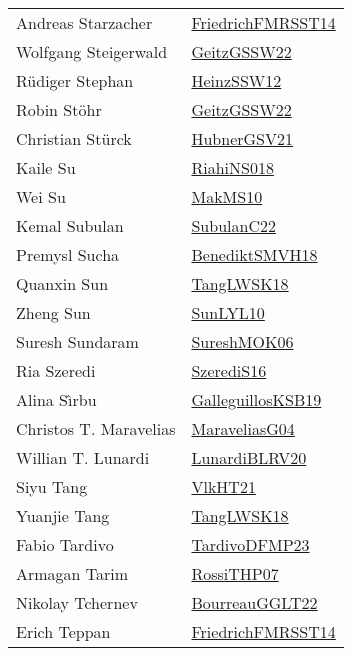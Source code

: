 {\begin{longtable}{p{4cm}p{20cm}}
Andreas Starzacher & \href{papers/FriedrichFMRSST14.pdf}{FriedrichFMRSST14}\cite{FriedrichFMRSST14} \\
Wolfgang Steigerwald & \href{papers/GeitzGSSW22.pdf}{GeitzGSSW22}\cite{GeitzGSSW22} \\
R{\"{u}}diger Stephan & \href{articles/HeinzSSW12.pdf}{HeinzSSW12}\cite{HeinzSSW12} \\
Robin St{\"{o}}hr & \href{papers/GeitzGSSW22.pdf}{GeitzGSSW22}\cite{GeitzGSSW22} \\
Christian St{\"{u}}rck & \href{articles/HubnerGSV21.pdf}{HubnerGSV21}\cite{HubnerGSV21} \\
Kaile Su & \href{papers/RiahiNS018.pdf}{RiahiNS018}\cite{RiahiNS018} \\
Wei Su & \href{papers/MakMS10.pdf}{MakMS10}\cite{MakMS10} \\
Kemal Subulan & \href{articles/SubulanC22.pdf}{SubulanC22}\cite{SubulanC22} \\
Premysl Sucha & \href{papers/BenediktSMVH18.pdf}{BenediktSMVH18}\cite{BenediktSMVH18} \\
Quanxin Sun & \href{articles/TangLWSK18.pdf}{TangLWSK18}\cite{TangLWSK18} \\
Zheng Sun & \href{papers/SunLYL10.pdf}{SunLYL10}\cite{SunLYL10} \\
Suresh Sundaram & \href{articles/SureshMOK06.pdf}{SureshMOK06}\cite{SureshMOK06} \\
Ria Szeredi & \href{papers/SzerediS16.pdf}{SzerediS16}\cite{SzerediS16} \\
Alina S{\^{\i}}rbu & \href{papers/GalleguillosKSB19.pdf}{GalleguillosKSB19}\cite{GalleguillosKSB19} \\
Christos T. Maravelias & \href{papers/MaraveliasG04.pdf}{MaraveliasG04}\cite{MaraveliasG04} \\
Willian T. Lunardi & \href{articles/LunardiBLRV20.pdf}{LunardiBLRV20}\cite{LunardiBLRV20} \\
Siyu Tang & \href{articles/VlkHT21.pdf}{VlkHT21}\cite{VlkHT21} \\
Yuanjie Tang & \href{articles/TangLWSK18.pdf}{TangLWSK18}\cite{TangLWSK18} \\
Fabio Tardivo & \href{papers/TardivoDFMP23.pdf}{TardivoDFMP23}\cite{TardivoDFMP23} \\
Armagan Tarim & \href{papers/RossiTHP07.pdf}{RossiTHP07}\cite{RossiTHP07} \\
Nikolay Tchernev & \href{articles/BourreauGGLT22.pdf}{BourreauGGLT22}\cite{BourreauGGLT22} \\
Erich Teppan & \href{papers/FriedrichFMRSST14.pdf}{FriedrichFMRSST14}\cite{FriedrichFMRSST14} \\

\end{longtable}}
